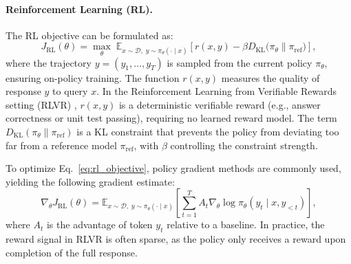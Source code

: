 \documentclass{article}
\begin{document}
\paragraph{Reinforcement Learning (RL).}
The RL objective can be formulated as:
\begin{equation}
J_{\text{RL}}(\theta) = \max_{\theta} \; \mathbb{E}_{x \sim \mathcal{D}, \; y \sim \pi_{\theta}(\cdot \mid x)} \left[ r(x, y) - \beta D_{\text{KL}}\bigl(\pi_{\theta} \parallel \pi_{\text{ref}}\bigr) \right],
\label{eq:rl_objective}
\end{equation}
where the trajectory $y = (y_1, \ldots, y_T)$ is sampled from the current policy $\pi_{\theta}$, ensuring on-policy training. The function $r(x, y)$ measures the quality of response $y$ to query $x$. In the Reinforcement Learning from Verifiable Rewards setting (RLVR) \citep{Venkatkrishna2026AletheiaWM}, $r(x, y)$ is a deterministic verifiable reward (e.g., answer correctness or unit test passing), requiring no learned reward model. The term $D_{\text{KL}}(\pi_{\theta} \parallel \pi_{\text{ref}})$ is a KL constraint that prevents the policy from deviating too far from a reference model $\pi_{\text{ref}}$, with $\beta$ controlling the constraint strength.

To optimize Eq.~\eqref{eq:rl_objective}, policy gradient methods are commonly used, yielding the following gradient estimate:
\begin{equation}
\nabla_{\theta} J_{\text{RL}}(\theta) = \mathbb{E}_{x \sim \mathcal{D}, \; y \sim \pi_{\theta}(\cdot \mid x)} \left[ \sum_{t=1}^{T} A_t \nabla_{\theta} \log \pi_{\theta}(y_t \mid x, y_{<t}) \right],
\label{eq:rl_gradient}
\end{equation}
where $A_t$ is the advantage of token $y_t$ relative to a baseline. In practice, the reward signal in RLVR is often sparse, as the policy only receives a reward upon completion of the full response.
\end{document}
